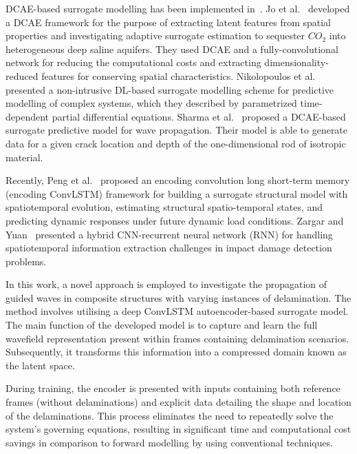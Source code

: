 \documentclass[pdflatex,sn-mathphys-num]{sn-jnl}%
\begin{document}
	DCAE-based surrogate modelling has been implemented 
	in~\cite{jo2021adaptive, nikolopoulos2022non, sharma2022wave}. 
	Jo et al.~\cite{jo2021adaptive} developed a DCAE framework for the purpose 
	of extracting latent features from spatial properties and investigating 
	adaptive surrogate estimation to sequester $CO_2$ into heterogeneous deep 
	saline aquifers. 
	They used DCAE and a fully-convolutional network for reducing the 
	computational costs and extracting dimensionality-reduced features for 
	conserving spatial characteristics. 
	Nikolopoulos et al.~\cite{nikolopoulos2022non} presented a non-intrusive 
	DL-based surrogate modelling scheme for predictive modelling of complex 
	systems, which they described by parametrized time-dependent partial 
	differential equations. 
	Sharma et al.~\cite{sharma2022wave} proposed a DCAE-based surrogate 
	predictive model for wave propagation. 
	Their model is able to generate data for a given crack location and depth 
	of the one-dimensional rod of isotropic material.
	
	Recently, Peng et al.~\cite{peng2021structural} proposed an encoding 
	convolution long short-term memory (encoding ConvLSTM) framework for 
	building a surrogate structural model with spatiotemporal evolution, 
	estimating structural spatio-temporal states, and predicting dynamic 
	responses under future dynamic load conditions. 
	Zargar and Yuan~\cite{zargar2021impact} presented a hybrid CNN-recurrent 
	neural network (RNN) for handling spatiotemporal information extraction 
	challenges in impact damage detection problems.
	
	In this work, a novel approach is employed to investigate the propagation 
	of guided waves in composite structures with varying instances of 
	delamination. 
	The method involves utilising a deep ConvLSTM autoencoder-based surrogate 
	model. 
	The main function of the developed model is to capture and learn the full 
	wavefield representation present within frames containing delamination 
	scenarios. 
	Subsequently, it transforms this information into a compressed domain known 
	as the latent space.
	
	During training, the encoder is presented with inputs containing both 
	reference frames (without delaminations) and explicit data detailing the 
	shape and location of the delaminations. 
	This process eliminates the need to repeatedly solve the system's governing 
	equations, resulting in significant time and computational cost savings in 
	comparison to forward modelling by using conventional techniques.
	
\end{document}
